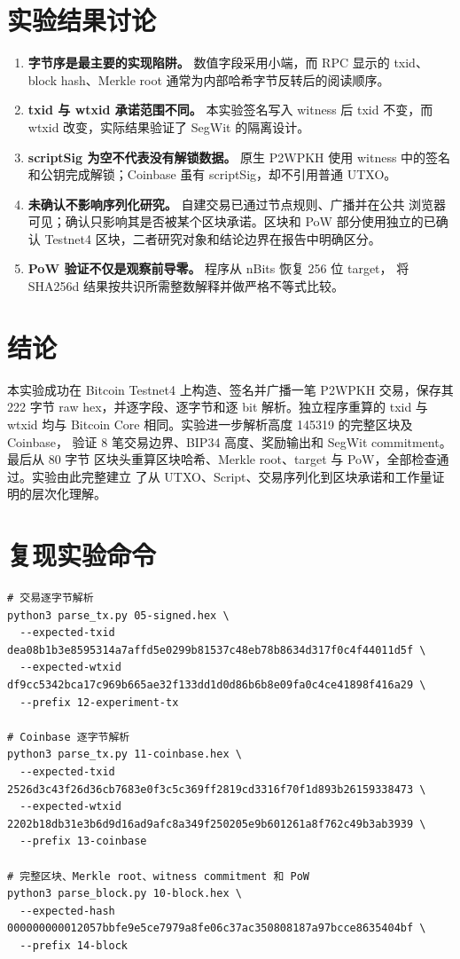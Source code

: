 \documentclass[UTF8,a4paper,12pt]{ctexart}
\begin{document}
\section{实验结果讨论}

\begin{enumerate}
  \item \textbf{字节序是最主要的实现陷阱。} 数值字段采用小端，而 RPC 显示的
  txid、block hash、Merkle root 通常为内部哈希字节反转后的阅读顺序。
  \item \textbf{txid 与 wtxid 承诺范围不同。} 本实验签名写入 witness 后 txid
  不变，而 wtxid 改变，实际结果验证了 SegWit 的隔离设计。
  \item \textbf{scriptSig 为空不代表没有解锁数据。} 原生 P2WPKH 使用 witness
  中的签名和公钥完成解锁；Coinbase 虽有 scriptSig，却不引用普通 UTXO。
  \item \textbf{未确认不影响序列化研究。} 自建交易已通过节点规则、广播并在公共
  浏览器可见；确认只影响其是否被某个区块承诺。区块和 PoW 部分使用独立的已确认
  Testnet4 区块，二者研究对象和结论边界在报告中明确区分。
  \item \textbf{PoW 验证不仅是观察前导零。} 程序从 nBits 恢复 256 位 target，
  将 SHA256d 结果按共识所需整数解释并做严格不等式比较。
\end{enumerate}

\section{结论}

本实验成功在 Bitcoin Testnet4 上构造、签名并广播一笔 P2WPKH 交易，保存其
222 字节 raw hex，并逐字段、逐字节和逐 bit 解析。独立程序重算的 txid 与 wtxid
均与 Bitcoin Core 相同。实验进一步解析高度 145319 的完整区块及 Coinbase，
验证 8 笔交易边界、BIP34 高度、奖励输出和 SegWit commitment。最后从 80 字节
区块头重算区块哈希、Merkle root、target 与 PoW，全部检查通过。实验由此完整建立
了从 UTXO、Script、交易序列化到区块承诺和工作量证明的层次化理解。

\section{复现实验命令}

\begin{lstlisting}[style=cmd]
# 交易逐字节解析
python3 parse_tx.py 05-signed.hex \
  --expected-txid dea08b1b3e8595314a7affd5e0299b81537c48eb78b8634d317f0c4f44011d5f \
  --expected-wtxid df9cc5342bca17c969b665ae32f133dd1d0d86b6b8e09fa0c4ce41898f416a29 \
  --prefix 12-experiment-tx

# Coinbase 逐字节解析
python3 parse_tx.py 11-coinbase.hex \
  --expected-txid 2526d3c43f26d36cb7683e0f3c5c369ff2819cd3316f70f1d893b26159338473 \
  --expected-wtxid 2202b18db31e3b6d9d16ad9afc8a349f250205e9b601261a8f762c49b3ab3939 \
  --prefix 13-coinbase

# 完整区块、Merkle root、witness commitment 和 PoW
python3 parse_block.py 10-block.hex \
  --expected-hash 000000000012057bbfe9e5ce7979a8fe06c37ac350808187a97bcce8635404bf \
  --prefix 14-block
\end{lstlisting}
\end{document}

